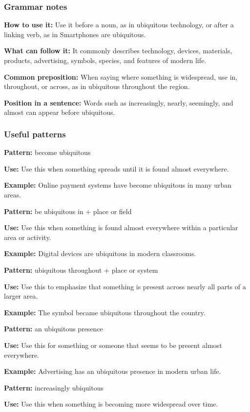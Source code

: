 \documentclass[11pt]{article}
\begin{document}
\subsubsection{Grammar notes}
\textbf{How to use it:} Use it before a noun, as in ubiquitous technology, or after a linking verb, as in Smartphones are ubiquitous.

\textbf{What can follow it:} It commonly describes technology, devices, materials, products, advertising, symbols, species, and features of modern life.

\textbf{Common preposition:} When saying where something is widespread, use in, throughout, or across, as in ubiquitous throughout the region.

\textbf{Position in a sentence:} Words such as increasingly, nearly, seemingly, and almost can appear before ubiquitous.

\subsubsection{Useful patterns}
\textbf{Pattern:} become ubiquitous

\textbf{Use:} Use this when something spreads until it is found almost everywhere.

\textbf{Example:} Online payment systems have become ubiquitous in many urban areas.

\textbf{Pattern:} be ubiquitous in + place or field

\textbf{Use:} Use this when something is found almost everywhere within a particular area or activity.

\textbf{Example:} Digital devices are ubiquitous in modern classrooms.

\textbf{Pattern:} ubiquitous throughout + place or system

\textbf{Use:} Use this to emphasize that something is present across nearly all parts of a larger area.

\textbf{Example:} The symbol became ubiquitous throughout the country.

\textbf{Pattern:} an ubiquitous presence

\textbf{Use:} Use this for something or someone that seems to be present almost everywhere.

\textbf{Example:} Advertising has an ubiquitous presence in modern urban life.

\textbf{Pattern:} increasingly ubiquitous

\textbf{Use:} Use this when something is becoming more widespread over time.
\end{document}
